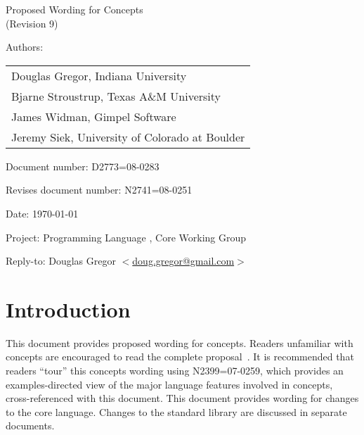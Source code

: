 \documentclass[american]{book}
\begin{document}
\raggedbottom

\begin{titlepage}
\huge
\begin{center}
Proposed Wording for Concepts\\
(Revision 9)
\end{center}

\normalsize
\vspace{0.25in}
\par\noindent Authors: 
\begin{tabular}[t]{l}
Douglas Gregor, Indiana University \\
Bjarne Stroustrup, Texas A\&M University \\
James Widman, Gimpel Software \\
Jeremy Siek, University of Colorado at Boulder
\end{tabular}\vspace{-6pt}

\par\noindent Document number: D2773=08-0283 \vspace{-6pt}
\par\noindent Revises document number: N2741=08-0251 \vspace{-6pt}
\par\noindent Date: \today\vspace{-6pt}
\par\noindent Project: Programming Language \Cpp{}, Core Working Group\vspace{-6pt}
\par\noindent Reply-to: Douglas Gregor $<$\href{mailto:doug.gregor@gmail.com}{doug.gregor@gmail.com}$>$

\section*{Introduction}
This document provides proposed wording for concepts. Readers
unfamiliar with concepts are encouraged to read the complete
proposal~\cite{GregorStroustrup06:concepts_rev_1}. 
%
It is recommended that readers ``tour'' this concepts wording using
N2399=07-0259, which provides an examples-directed view of the major
language features involved in concepts, cross-referenced with this
document.  
%
This document
provides wording for changes to the core language. Changes to the
standard library are discussed in separate documents.


\end{titlepage}
\end{document}
